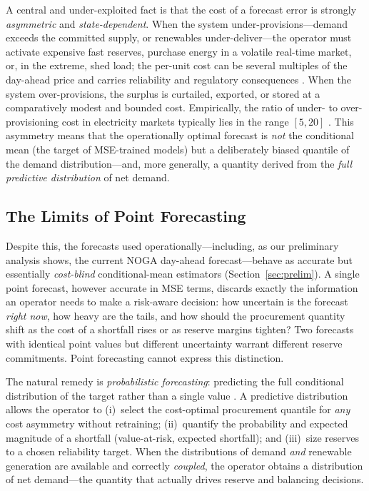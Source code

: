 \documentclass[12pt,a4paper]{article}
\begin{document}
A central and under-exploited fact is that the cost of a forecast error is strongly
\emph{asymmetric} and \emph{state-dependent}. When the system under-provisions---demand
exceeds the committed supply, or renewables under-deliver---the operator must activate
expensive fast reserves, purchase energy in a volatile real-time market, or, in the
extreme, shed load; the per-unit cost can be several multiples of the day-ahead price and
carries reliability and regulatory consequences \parencite{stoft2002power}. When the
system over-provisions, the surplus is curtailed, exported, or stored at a comparatively
modest and bounded cost. Empirically, the ratio of under- to over-provisioning cost in
electricity markets typically lies in the range $[5,20]$
\parencite{zhang2022costoriented}. This asymmetry means that the operationally optimal
forecast is \emph{not} the conditional mean (the target of MSE-trained models) but a
deliberately biased quantile of the demand distribution---and, more generally, a quantity
derived from the \emph{full predictive distribution} of net demand.

\subsection{The Limits of Point Forecasting}
\label{sec:limits}

Despite this, the forecasts used operationally---including, as our preliminary analysis
shows, the current NOGA day-ahead forecast---behave as accurate but essentially
\emph{cost-blind} conditional-mean estimators (Section~\ref{sec:prelim}). A single point
forecast, however accurate in MSE terms, discards exactly the information an operator
needs to make a risk-aware decision: how uncertain is the forecast \emph{right now}, how
heavy are the tails, and how should the procurement quantity shift as the cost of a
shortfall rises or as reserve margins tighten? Two forecasts with identical point values
but different uncertainty warrant different reserve commitments. Point forecasting cannot
express this distinction.

The natural remedy is \emph{probabilistic forecasting}: predicting the full conditional
distribution of the target rather than a single value \parencite{gneiting2014probabilistic,
hong2016probabilistic}. A predictive distribution allows the operator to (i)~select the
cost-optimal procurement quantile for \emph{any} cost asymmetry without retraining;
(ii)~quantify the probability and expected magnitude of a shortfall (value-at-risk,
expected shortfall); and (iii)~size reserves to a chosen reliability target. When the
distributions of demand \emph{and} renewable generation are available and correctly
\emph{coupled}, the operator obtains a distribution of net demand---the quantity that
actually drives reserve and balancing decisions.
\end{document}
